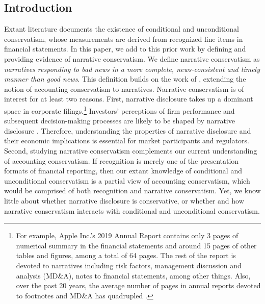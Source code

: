 \documentclass[a4paper]{article}
\begin{document}
\begin{spacing}{2}
\clearpage

\setcounter{page}{1}
\section{Introduction}
Extant literature documents the existence of conditional and unconditional conservatism, whose measurements are derived from recognized line items in financial statements. %
In this paper, we add to this prior work by defining and providing evidence of narrative conservatism. We define narrative conservatism as \textit{narratives responding to bad news in a more complete, news-consistent and timely manner than good news}. This definition builds on the work of , extending the notion of accounting conservatism to narratives. Narrative conservatism is of interest for at least two reasons. First, narrative disclosure takes up a dominant space in corporate filings.\footnote{For example, Apple Inc.'s 2019 Annual Report contains only 3 pages of numerical summary in the financial statements and around 15 pages of other tables and figures, among a total of 64 pages. The rest of the report is devoted to narratives including risk factors, management discussion and analysis (MD\&A), notes to financial statements, among other things. Also, over the past 20 years, the average number of pages in annual reports devoted to footnotes and MD\&A has quadrupled \cite{eyPointNowTime2012}.} Investors' perceptions of firm performance and subsequent decision-making processes are likely to be shaped by narrative disclosure . Therefore, understanding the properties of narrative disclosure and their economic implications is essential for market participants and regulators. Second, studying narrative conservatism complements our current understanding of accounting conservatism. If recognition is merely one of the presentation formats of financial reporting, then our extant knowledge of conditional and unconditional conservatism is a partial view of accounting conservatism, which would be comprised of both recognition and narrative conservatism. Yet, we know little about whether narrative disclosure is conservative, or whether and how narrative conservatism interacts with conditional and unconditional conservatism.


\end{spacing}
\end{document}
